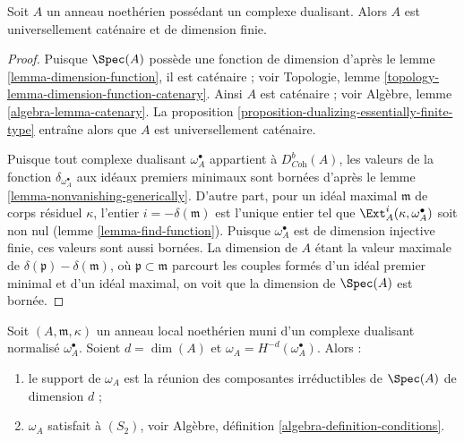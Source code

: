 \begin{lemma}
\label{lemma-universally-catenary}
Soit $A$ un anneau noethérien possédant un complexe dualisant.
Alors $A$ est universellement caténaire et de dimension finie.
\end{lemma}

\begin{proof}
Puisque $\Spec(A)$ possède une fonction de dimension d'après le lemme \ref{lemma-dimension-function},
il est caténaire ; voir Topologie, lemme \ref{topology-lemma-dimension-function-catenary}.
Ainsi $A$ est caténaire ; voir Algèbre, lemme \ref{algebra-lemma-catenary}.
La proposition \ref{proposition-dualizing-essentially-finite-type} entraîne alors que $A$ est universellement caténaire.

\medskip\noindent
Puisque tout complexe dualisant $\omega_A^\bullet$ appartient à $D^b_{\textit{Coh}}(A)$,
les valeurs de la fonction $\delta_{\omega_A^\bullet}$ aux idéaux premiers minimaux
sont bornées d'après le lemme \ref{lemma-nonvanishing-generically}.
D'autre part, pour un idéal maximal $\mathfrak m$ de corps résiduel $\kappa$,
l'entier $i = -\delta(\mathfrak m)$ est l'unique entier tel que $\Ext_A^i(\kappa, \omega_A^\bullet)$ soit non nul
(lemme \ref{lemma-find-function}).
Puisque $\omega_A^\bullet$ est de dimension injective finie, ces valeurs sont aussi bornées.
La dimension de $A$ étant la valeur maximale de $\delta(\mathfrak p) - \delta(\mathfrak m)$,
où $\mathfrak p \subset \mathfrak m$ parcourt les couples formés d'un idéal premier minimal
et d'un idéal maximal, on voit que la dimension de $\Spec(A)$ est bornée.
\end{proof}

\begin{lemma}
\label{lemma-depth-dualizing-module}
Soit $(A, \mathfrak m, \kappa)$ un anneau local noethérien muni d'un complexe dualisant normalisé $\omega_A^\bullet$.
Soient $d = \dim(A)$ et $\omega_A = H^{-d}(\omega_A^\bullet)$. Alors :
\begin{enumerate}
\item le support de $\omega_A$ est la réunion des composantes irréductibles
de $\Spec(A)$ de dimension $d$ ;
\item $\omega_A$ satisfait à $(S_2)$, voir Algèbre, définition \ref{algebra-definition-conditions}.
\end{enumerate}
\end{lemma}

